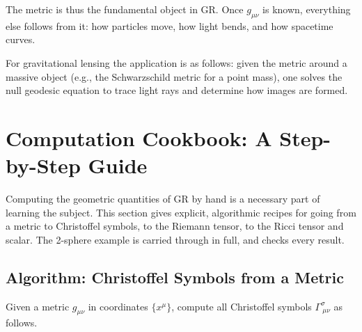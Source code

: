 \noindent
The metric is thus the fundamental object
in GR.  Once $g_{\mu\nu}$ is known, everything else follows from it:
how particles move, how light bends, and how spacetime curves.

For gravitational lensing the application is as follows: given the metric
around a massive object (e.g., the Schwarzschild metric for a point mass),
one solves the null geodesic equation to trace light rays and determine how
images are formed.


\section{Computation Cookbook: A Step-by-Step Guide}
\label{sec:dg_cookbook}

Computing the geometric quantities of GR by hand is a necessary part of
learning the subject.
This section gives explicit, algorithmic recipes for going from a metric
to Christoffel symbols, to the Riemann tensor, to the Ricci tensor and
scalar.  The 2-sphere example is carried through in full, and
checks every result.

\subsection{Algorithm: Christoffel Symbols from a Metric}
\label{sec:dg_cookbook_christoffel}

Given a metric $g_{\mu\nu}$ in coordinates $\{x^\mu\}$, compute all
Christoffel symbols $\Gamma^\sigma_{\ \mu\nu}$ as follows.

